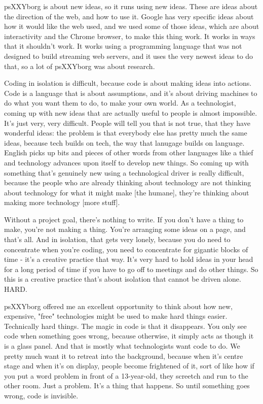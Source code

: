 psXXYborg is about new ideas, so it runs using new ideas. These are ideas about the direction of the web, and how to use it. Google has very specific ideas about how it would like the web used, and we used some of those ideas, which are about interactivity and the Chrome browser, to make this thing work. It works in ways that it shouldn't work. It works using a programming language that was not designed to build streaming web servers, and it uses the very newest ideas to do that, so a lot of psXXYborg was about research.

Coding in isolation is difficult, because code is about making ideas into actions. Code is a language that is about assumptions, and it's about driving machines to do what you want them to do, to make your own world. As a technologist, coming up with new ideas that are actually useful to people is almost impossible. It's just very, very difficult. People will tell you that is not true, that they have wonderful ideas: the problem is that everybody else has pretty much the same ideas, because tech builds on tech, the way that lanugage builds on language. English picks up bits and pieces of other words from other languages like a thief and technology advances upon itself to develop new things. So coming up with something that's genuinely new using a technological driver is really difficult, because the people who are already thinking about technology are not thinking about technology for what it might make [the humane], they're thinking about making more technology [more stuff]. 

Without a project goal, there's nothing to write. If you don't have a thing to make, you're not making a thing. You're arranging some ideas on a page, and that's all. And in isolation, that gets very lonely, because you do need to concentrate when you're coding, you need to concentrate for gigantic blocks of time - it's a creative practice that way. It's very hard to hold ideas in your head for a long period of time if you have to go off to meetings and do other things. So this is a creative practice that's about isolation that cannot be driven alone. HARD.

psXXYborg offered me an excellent opportunity to think about how new, expensive, "free" technologies might be used to make hard things easier. Technically hard things. The magic in code is that it disappears. You only see code when something goes wrong, because otherwise, it simply acts as though it is a glass panel. And that is mostly what technologists want code to do. We pretty much want it to retreat into the background, because when it's centre stage and when it's on display, people become frightened of it, sort of like how if you put a word problem in front of a 13-year-old, they screetch and run to the other room. Just a problem. It's a thing that happens. So until something goes wrong, code is invisible.

